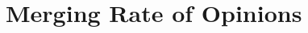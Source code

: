 \documentclass[
  a4paper,
  12pt,
  twoside,
  openright
]{book}
\begin{document}
\begin{subappendices}

\end{subappendices}


\chapter{Merging Rate of Opinions}









\backmatter


{}

\end{document}
